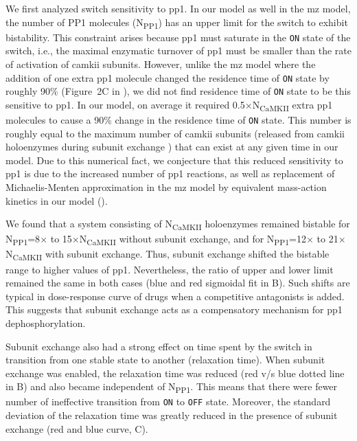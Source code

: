 \documentclass[9pt,lineno]{elife}
\newcommand\SUB[2]{#1\textsubscript{#2}}
\begin{document}
We first analyzed switch sensitivity to \gls{pp1}. In our model as well in the
\gls{mz} model, the number of PP1 molecules (\SUB{N}{PP1}) has an upper limit
for the switch to exhibit bistability. This constraint arises because \gls{pp1}
must saturate in the \texttt{ON} state of the switch, i.e., the maximal
enzymatic turnover of \gls{pp1} must be smaller than the rate of activation of
\gls{camkii} subunits.  However, unlike the \gls{mz} model where the addition of
one extra \gls{pp1} molecule changed the residence time of \texttt{ON} state by
roughly 90\% (Figure~2C in \citep{miller_stability_2005}), we did not find
residence time of \texttt{ON} state to be this sensitive to \gls{pp1}. In our
model, on average it required 0.5$\times$\SUB{N}{CaMKII} extra \gls{pp1}
molecules to cause a 90\% change in the residence time of \texttt{ON} state.
This number is roughly equal to the maximum number of \gls{camkii} subunits
(released from \gls{camkii} holoenzymes during subunit exchange )
that can exist at any given time in our model. Due to this numerical fact, we
conjecture that this reduced sensitivity to \gls{pp1} is due to the increased
number of \gls{pp1} reactions, as well as replacement of Michaelis-Menten
approximation in the \gls{mz} model by equivalent mass-action kinetics in our
model (). 

We found that a system consisting of \SUB{N}{CaMKII} holoenzymes remained
bistable for \SUB{N}{PP1}=8$\times$ to 15$\times$\SUB{N}{CaMKII} without subunit
exchange, and for \SUB{N}{PP1}=12$\times$ to 21$\times$\SUB{N}{CaMKII} with
subunit exchange. Thus, subunit exchange shifted the bistable range to higher
values of \gls{pp1}. Nevertheless, the ratio of upper and lower limit remained
the same in both cases (blue and red sigmoidal fit in B).
Such shifts are typical in dose-response curve of drugs when a competitive
antagonists is added. This suggests that subunit exchange acts as a compensatory
mechanism for \gls{pp1} dephosphorylation.

Subunit exchange also had a strong effect on time spent by the switch in
transition from one stable state to another (relaxation time). When subunit
exchange was enabled, the relaxation time was reduced (red v/s blue dotted line
in B) and also became independent of \SUB{N}{PP1}. This means
that there were fewer number of ineffective transition from \texttt{ON} to
\texttt{OFF} state.
Moreover, the standard deviation of the relaxation time was greatly reduced in the
presence of subunit exchange (red and blue curve, C). 
\end{document}
